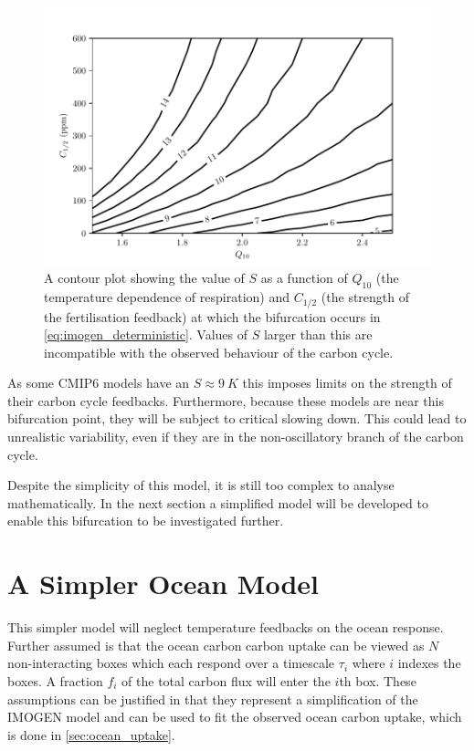 \begin{figure}
  \centering
  \includegraphics[keepaspectratio,width=\textwidth]{imogen_critical_S_Q10_ca05}
  \caption[The dependence of the critical values of $S$ on $Q_{10}$ and $C_{1/2}$]{A contour plot showing the value of $S$ as a function of $Q_{10}$ (the temperature dependence of respiration)
    and $C_{1/2}$ (the strength of the  fertilisation
    feedback) at which the bifurcation occurs in \cref{eq:imogen_deterministic}.
    Values of $S$ larger than  this are incompatible with the observed behaviour of the carbon cycle.}
  \label{fig:imogen_bifurcation_plane}
\end{figure}

As some CMIP6 models have an $S \approx\SI{9}{K}$ this imposes limits on the strength of their carbon cycle feedbacks. Furthermore, because these models are
near this bifurcation point, they will be subject to critical slowing down. This could lead to unrealistic  variability, even if they are
in the non-oscillatory branch of the carbon cycle.

Despite the simplicity of this model, it is still too complex to analyse mathematically. In the next section a simplified model will be developed to enable this bifurcation to be investigated further.

\section{A Simpler Ocean Model}
This simpler model will neglect temperature feedbacks on the ocean response. Further assumed is that the ocean carbon carbon uptake
can be viewed as $N$ non-interacting boxes which each respond over a timescale $\tau_i$ where $i$ indexes the boxes. A fraction $f_i$ of the total carbon
flux will enter the $i$th box. These assumptions can be justified in that they represent a simplification of the IMOGEN model and can be used to fit the observed ocean carbon
uptake, which is done in \cref{sec:ocean_uptake}.

